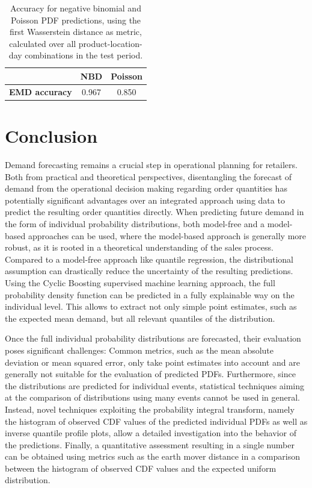 \documentclass[BCOR=1mm, DIV=calc,10pt,
twoside=true,
twocolumn,
headings=normal]{scrartcl}
\begin{document}
\begin{table}[h!]
\begin{center}
\caption{Accuracy for negative binomial and Poisson PDF predictions, using the first Wasserstein distance as metric, calculated over all product-location-day combinations in the test period.}
\label{tab:cdf_acc}
\begin{tabular}{c|c|c}
 & \textbf{NBD} & \textbf{Poisson} \\
\hline
\textbf{EMD accuracy} & 0.967 & 0.850
\end{tabular}
\end{center}
\end{table}


\section{Conclusion}
Demand forecasting remains a crucial step in operational planning for retailers. Both from practical and theoretical perspectives, disentangling the forecast of demand from the operational decision making regarding order quantities has potentially significant advantages over an integrated approach using data to predict the resulting order quantities directly. When predicting future demand in the form of individual probability distributions, both model-free and a model-based approaches can be used, where the model-based approach is generally more robust, as it is rooted in a theoretical understanding of the sales process. Compared to a model-free approach like quantile regression, the distributional assumption can drastically reduce the uncertainty of the resulting predictions. Using the Cyclic Boosting supervised machine learning approach, the full probability density function can be predicted in a fully explainable way on the individual level. This allows to extract not only simple point estimates, such as the expected mean demand, but all relevant quantiles of the distribution.

Once the full individual probability distributions are forecasted, their evaluation poses significant challenges: Common metrics, such as the mean absolute deviation or mean squared error, only take point estimates into account and are generally not suitable for the evaluation of predicted PDFs. Furthermore, since the distributions are predicted for individual events, statistical techniques aiming at the comparison of distributions using many events cannot be used in general. Instead, novel techniques exploiting the probability integral transform, namely the histogram of observed CDF values of the predicted individual PDFs as well as inverse quantile profile plots, allow a detailed investigation into the behavior of the predictions. Finally, a quantitative assessment resulting in a single number can be obtained using metrics such as the earth mover distance in a comparison between the histogram of observed CDF values and the expected uniform distribution.
\end{document}
